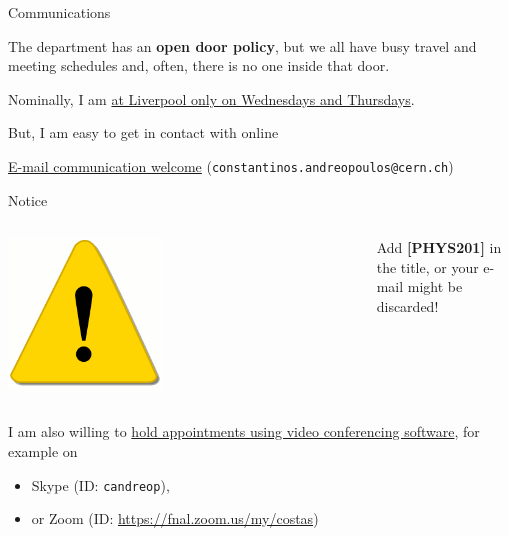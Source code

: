 \begin{frame}{Communications}

The department has an {\bf open door policy}, but we all have busy travel
and meeting schedules and, often, there is no one inside that door.\\

\vspace{0.2cm}

Nominally, I am \underline{at Liverpool only on Wednesdays and Thursdays}.\\

\vspace{0.2cm}

But, I am easy to get in contact with online\\

\vspace{0.2cm}

\underline{E-mail communication welcome}
({\tt \small {\color{blue}constantinos.andreopoulos@cern.ch}})\\

\begin{block001}{Notice}
\begin{columns}
  \begin{column}{0.15\textwidth}
   \begin{center}
     \includegraphics[width=0.45\textwidth]{./images/icons/warning.png}\\
   \end{center}
  \end{column}
  \begin{column}{0.85\textwidth}
  {\small
     Add {\bf [PHYS201]} in the title, or your e-mail might be discarded!
   }
  \end{column}
\end{columns}
\end{block001}

\vspace{0.2cm}

I am also willing to \underline{hold appointments
using video conferencing software},
for example on
\begin{itemize}
 \item Skype (ID: {\tt \color{blue}candreop}),
 \item or Zoom (ID: {\color{blue} \url{https://fnal.zoom.us/my/costas}})
\end{itemize}

\end{frame}

